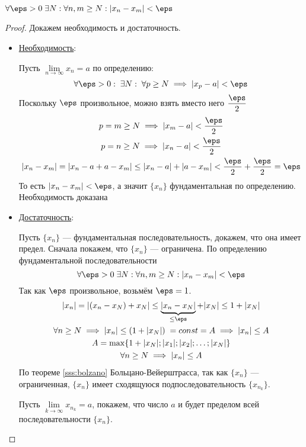 \documentclass[12pt, a4paper]{article}
\begin{document}
	$\forall \eps > 0 \; \exists N: \forall n, m \geq N: |x_n - x_m| < \eps$
	\begin{proof}
		Докажем необходимость и достаточность.
		\begin{itemize}
			\item
			\underline{Необходимость}:

			Пусть $\lim\limits_{n \to \infty} x_n = a$ по определению:
			\begin{equation*}
				\forall \eps > 0: \; \exists N: \; \forall p \geq N \implies |x_p - a| < \eps
			\end{equation*}
			Поскольку $\eps$ произвольное, можно взять вместо него $\dfrac{\eps}{2}$
			\[\begin{gathered}
				p = m \geq N \implies |x_m - a| < \frac{\eps}{2} \\
				p = n \geq N \implies |x_n - a| < \frac{\eps}{2} \\
				|x_n - x_m| = |x_n - a + a - x_m| \leq |x_n - a| + |a - x_m| < \frac{\eps}{2} + \frac{\eps}{2} = \eps
			\end{gathered}\]
			То есть $|x_n - x_m| < \eps$, а значит $\{x_n\}$ фундаментальная по определению. Необходимость доказана

			\item
			\underline{Достаточность}:

			Пусть $\{x_n\}$ --- фундаментальная последовательность, докажем, что она имеет предел. Сначала покажем, что $\{x_n\}$ --- ограничена. По определению фундаментальной последовательности
			\begin{equation*}
				\forall \eps > 0 \; \exists N: \forall n, m \geq N: |x_n - x_m| < \eps
			\end{equation*}
			Так как $\eps$ произвольное, возьмём $\eps = 1$. 
			\[\begin{gathered}
				|x_n| = |(x_n - x_N) + x_N| \leq \underbrace{|x_n - x_N|}_{\leq \eps} + |x_N| \leq 1 + |x_N| \\
				\forall n \geq N \implies |x_n| \leq (1 + |x_N|) \; = const = A \implies |x_n| \leq A \\
				A = \max\{1 + |x_N|; |x_1|; |x_2|; \dots; |x_N|\} \\
				\forall n \geq N \implies |x_n| \leq A
			\end{gathered}\]
			По теореме \ref{sss:bolzano} Больцано-Вейерштрасса, так как $\{x_n\}$ --- ограниченная, $\{x_n\}$ имеет сходящуюся подпоследовательность $\{x_{n_k}\}$.

			Пусть $\lim\limits_{k \to \infty} x_{n_k} = a$, покажем, что число $a$ и будет пределом всей последовательности $\{x_n\}$.


\end{itemize}
\end{proof}
\end{document}
